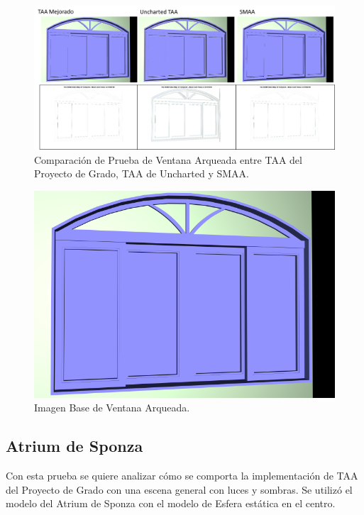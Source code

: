 \documentclass[pregrado]{tesis-usb} %
\begin{document}
\begin{figure}[!htb]
	\centering
	\includegraphics[scale=0.3]{images/results/window_arch.png}
	\caption{Comparación de Prueba de Ventana Arqueada entre TAA del Proyecto de Grado, TAA de Uncharted y SMAA.}\label{fig:window_arch_render}
\end{figure}

\begin{figure}[!htb]
	\centering
	\includegraphics[scale=0.18]{images/results/window_arch_sobel_ground_truth.png}
	\caption{Imagen Base de Ventana Arqueada.}\label{fig:window_arch_truth}
\end{figure}

\FloatBarrier

\subsection{Atrium de Sponza}
Con esta prueba se quiere analizar cómo se comporta la implementación de TAA del Proyecto de Grado con una escena general con luces y sombras. Se utilizó el modelo del Atrium de Sponza con el modelo de Esfera estática en el centro.
\end{document}
